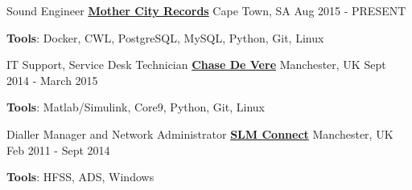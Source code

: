 \begin{cventries}  
  \cventry
  	{Sound Engineer}
  	{\href{https://mcrecords.co.za}{\textbf{Mother City Records}}}
  	{Cape Town, SA}
  	{Aug 2015 - PRESENT}
  	{
  		\begin{cvitems}
  				\item {}
  				\item {}   
  				\item {}
  				\item {}
  				\item {}
  				\item {\textbf{Tools}: Docker, CWL, PostgreSQL, MySQL, Python, Git, Linux}
  		\end{cvitems}
  	}
  \cventry
  	{IT Support, Service Desk Technician}
  	{\href{https://chasedevere.co.uk}{\textbf{Chase De Vere}}}
  	{Manchester, UK}
  	{Sept 2014 - March 2015}
  	{
  		\begin{cvitems}
  				\item {}
  				\item {}
  				\item {}
  				\item {}
  				\item {\textbf{Tools}: Matlab/Simulink, Core9, Python, Git, Linux}
  		\end{cvitems}
  	}
  \cventry
  	{Dialler Manager and Network Administrator}
  	{\href{www.slmconnect.co.uk}{\textbf{SLM  Connect}}}
  	{Manchester, UK}
  	{Feb 2011 - Sept 2014}
  	{
  		\begin{cvitems}
  			\item {} 
  			\item {	}
  			\item {\textbf{Tools}: HFSS, ADS, Windows}
  		\end{cvitems}
  	}
\end{cventries}
